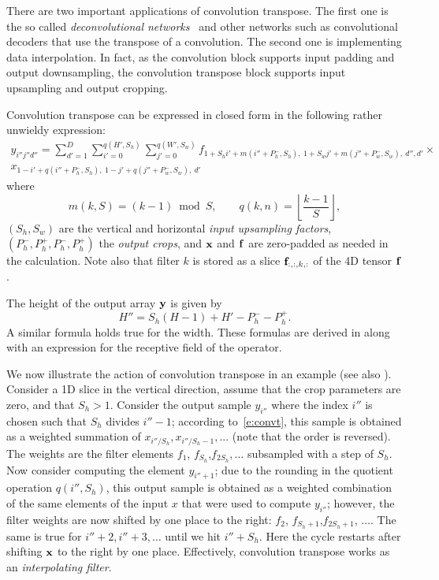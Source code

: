 There are two important applications of convolution transpose. The first one is the so called \emph{deconvolutional networks}~\cite{zeiler14visualizing} and other networks such as convolutional decoders that use the transpose of a convolution. The second one is implementing data interpolation. In fact, as the convolution block supports input padding and output downsampling, the convolution transpose block supports input upsampling and output cropping.

Convolution transpose can be expressed in closed form in the following rather unwieldy expression:
\begin{multline}\label{e:convt}
y_{i''j''d''} =
\sum_{d'=1}^{D}
\sum_{i'=0}^{q(H',S_h)}
\sum_{j'=0}^{q(W',S_w)}
f_{
	1+ S_hi' + m(i''+ P_h^-, S_h),\ %
	1+ S_wj' + m(j''+ P_w^-, S_w),\ %
	d'',
	d'
}
\times \\
x_{
	1 - i' + q(i''+P_h^-,S_h),\ %
	1 - j' + q(j''+P_w^-,S_w),\ %
	d'
}
\end{multline}
where
\[
m(k,S) = (k - 1) \bmod S,
\qquad
q(k,n) = \left\lfloor \frac{k-1}{S} \right\rfloor,
\]
$(S_h,S_w)$ are the vertical and horizontal \emph{input upsampling factors},  $(P_h^-,P_h^+,P_h^-,P_h^+)$ the \emph{output crops}, and $\mathbf{x}$ and $\mathbf{f}$ are zero-padded as needed in the calculation. Note also that filter $k$ is stored as a slice $\mathbf{f}_{:,:,k,:}$ of the 4D tensor $\mathbf{f}$.

The height of the output array $\mathbf{y}$ is given by
\[
H'' = S_h (H - 1) + H' -P^-_h - P^+_h.
\]
A similar formula holds true for the width. These formulas are derived in  along with an expression for the receptive field of the operator.

We now illustrate the action of convolution transpose in an example (see also ).  Consider a 1D slice in the vertical direction, assume that the crop parameters are zero, and that $S_h>1$. Consider the output sample $y_{i''}$ where the index $i''$ is chosen such that $S_h$ divides $i''-1$; according to~\eqref{e:convt}, this sample is obtained as a weighted summation of $x_{i'' / S_h},x_{i''/S_h-1},...$ (note that the order is reversed). The weights are the filter elements $f_1$, $f_{S_h}$,$f_{2S_h},\dots$ subsampled with a step of $S_h$. Now consider computing the element $y_{i''+1}$; due to the rounding in the quotient operation $q(i'',S_h)$, this output sample is obtained as a weighted combination of the same elements of the input $x$ that were used to compute $y_{i''}$; however, the filter weights are now shifted by one place to the right: $f_2$, $f_{S_h+1}$,$f_{2S_h+1}$, $\dots$. The same is true for $i''+2, i'' + 3,\dots$ until we hit $i'' + S_h$. Here the cycle restarts after shifting $\mathbf{x}$ to the right by one place. Effectively, convolution transpose works as an \emph{interpolating filter}.

